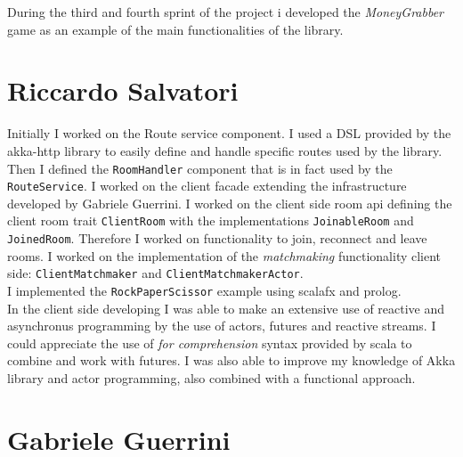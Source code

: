 During the third and fourth sprint of the project i developed the \textit{MoneyGrabber} game as an example of the main functionalities of the library. 



\section{Riccardo Salvatori}
Initially I worked on the Route service component. I used a DSL provided by the akka-http library to easily define and handle specific routes used by the library. Then I defined the \texttt{RoomHandler} component that is in fact used by the \texttt{RouteService}.
I worked on the client facade extending the infrastructure developed by Gabriele Guerrini. I worked on the client side room api defining the client room trait \texttt{ClientRoom} with the implementations \texttt{JoinableRoom} and \texttt{JoinedRoom}. Therefore I worked on functionality to join, reconnect and leave rooms.
I worked on the implementation of the \textit{matchmaking} functionality client side: \texttt{ClientMatchmaker} and \texttt{ClientMatchmakerActor}.
\\
I implemented the \texttt{RockPaperScissor} example using scalafx and prolog.
\\
In the client side developing I was able to make an extensive use of reactive and asynchronus programming by the use of actors, futures and reactive streams.
I could appreciate the use of \textit{for comprehension} syntax provided by scala to combine and work with futures.
I was also able to improve my knowledge of Akka library and actor programming, also combined with a functional approach.

\section{Gabriele Guerrini}

